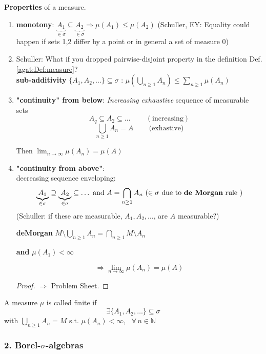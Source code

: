 \textbf{Properties} of a measure.\label{agat:Thm:MeasureProperties}
\begin{enumerate}
	\item[(i)] \textbf{monotony}: $\underbrace{A_1}_{\in \sigma} \subseteq \underbrace{A_2}_{\in \sigma} \Longrightarrow \mu(A_1) \leq \mu(A_2)$ (Schuller, EY: Equality could happen if sets 1,2 differ by a point or in general a set of measure 0)
	\item[(ii)] Schuller: What if you dropped pairwise-disjoint property in the definition Def. \ref{agat:Def:measure}? \\
	\textbf{sub-additivity} $\lbrace A_1, A_2, \dots \rbrace \subseteq \sigma$ : $\mu \left( \bigcup_{n\geq 1} A_n \right) \leq \sum_{n\geq 1} \mu (A_n)$
	\item[(iii)] \textbf{"continuity" from below}: \emph{Increasing exhaustive} sequence of measurable sets
	\[
	A_q \subseteq A_2 \subseteq \dots \quad \quad \, (\text{increasing})
		\]
		\[
		\bigcup_{n \geq 1} A_n = A \quad \quad \, \text{(exhastive)}
		\]
		
		Then $\lim_{n\to \infty} \mu(A_n) = \mu(A)$
	\item[(iv)] \textbf{"continuity from above"}: \\
	decreasing sequence enveloping: 
	\[
	\underbrace{A_1}_{\in \sigma} \supseteq \underbrace{A_2}_{\in \sigma} \subseteq \dots \text{ and } A = \bigcap_{n \geq 1 } A_n \, \left( \in \sigma \text{ due to \textbf{de Morgan} rule }\right)
	\]
	(Schuller: if these are measurable, $A_1, A_2, \dots$, are $A$ measurable?)

	\textbf{deMorgan} $M \setminus \bigcup_{n \geq 1} A_n = \bigcap_{n \geq 1} M \setminus A_n$

	\textbf{ and } $\mu (A_1) < \infty$

\[
\Longrightarrow \lim_{n \to \infty} \mu(A_n) = \mu(A)
\]

\begin{proof}
	$\Longrightarrow$ Problem Sheet.
\end{proof}

\end{enumerate}


\begin{definition} A measure $\mu$ is called finite if 
	\[
	\exists \lbrace A_1, A_2, \dots \rbrace \subseteq \sigma
	\]
	with $\bigcup_{n \geq 1} A_n = M$ s.t. $\mu (A_n) < \infty$, \, $\forall \, n \in \mathbb{N}$
\end{definition}

\subsubsection{2. Borel-$\sigma$-algebras}

